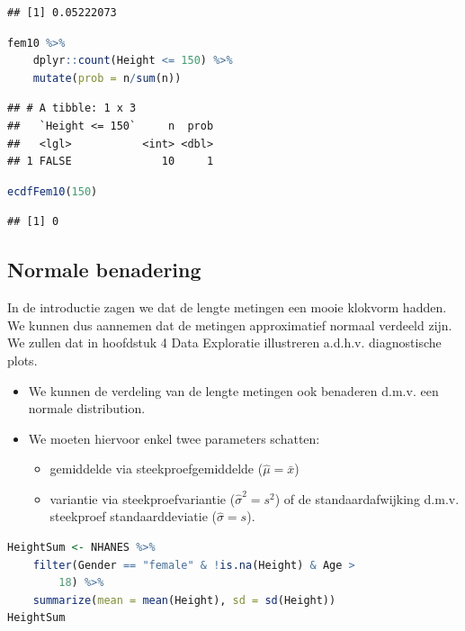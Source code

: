 \documentclass[
  12pt,dutch,coursenotes]{book}
\providecommand{\tightlist}{%
  \setlength{\itemsep}{0pt}\setlength{\parskip}{0pt}}
\theoremstyle{definition}
\theoremstyle{definition}
\theoremstyle{definition}
\theoremstyle{definition}
\theoremstyle{remark}
\begin{document}
\begin{lstlisting}
## [1] 0.05222073
\end{lstlisting}

\begin{lstlisting}[language=R]
fem10 %>%
    dplyr::count(Height <= 150) %>%
    mutate(prob = n/sum(n))
\end{lstlisting}

\begin{lstlisting}
## # A tibble: 1 x 3
##   `Height <= 150`     n  prob
##   <lgl>           <int> <dbl>
## 1 FALSE              10     1
\end{lstlisting}

\begin{lstlisting}[language=R]
ecdfFem10(150)
\end{lstlisting}

\begin{lstlisting}
## [1] 0
\end{lstlisting}

\hypertarget{normale-benadering}{%
\subsection{Normale benadering}\label{normale-benadering}}

In de introductie zagen we dat de lengte metingen een mooie klokvorm hadden. We kunnen dus aannemen dat de metingen approximatief normaal verdeeld zijn. We zullen dat in hoofdstuk 4 Data Exploratie illustreren a.d.h.v. diagnostische plots.

\begin{itemize}
\item
  We kunnen de verdeling van de lengte metingen ook benaderen d.m.v. een normale distribution.
\item
  We moeten hiervoor enkel twee parameters schatten:

  \begin{itemize}
  \tightlist
  \item
    gemiddelde via steekproefgemiddelde (\(\hat\mu=\bar x\))
  \item
    variantie via steekproefvariantie (\(\hat{\sigma}^2= s^2\)) of de standaardafwijking d.m.v. steekproef standaarddeviatie (\(\hat\sigma=s\)).
  \end{itemize}
\end{itemize}

\begin{lstlisting}[language=R]
HeightSum <- NHANES %>%
    filter(Gender == "female" & !is.na(Height) & Age >
        18) %>%
    summarize(mean = mean(Height), sd = sd(Height))
HeightSum
\end{lstlisting}
\end{document}
